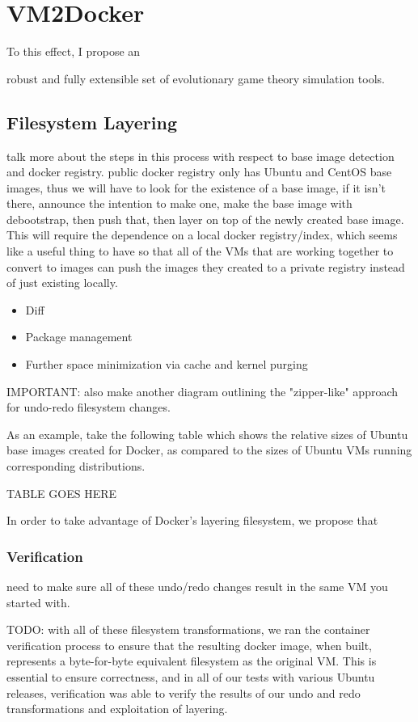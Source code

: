 \documentclass[\myfontsize, letterpaper]{article}
\newcommand{\projectname}{VM2Docker}
\begin{document}
\section{\projectname}
To this effect, I propose an

 robust and fully extensible set of evolutionary game theory simulation tools. 

\subsection{Filesystem Layering}

talk more about the steps in this process with respect to base image detection and docker registry. public docker registry only has Ubuntu and CentOS base images, thus we will have to look for the existence of a base image, if it isn't there, announce the intention to make one, make the base image with debootstrap, then push that, then layer on top of the newly created base image. This will require the dependence on a local docker registry/index, which seems like a useful thing to have so that all of the VMs that are working together to convert to images can push the images they created to a private registry instead of just existing locally.


\begin{itemize}
\item Diff
\item Package management
\item Further space minimization via cache and kernel purging
\end{itemize}


IMPORTANT: also make another diagram outlining the "zipper-like" approach for undo-redo filesystem changes.

As an example, take the following table which shows the relative sizes of Ubuntu base images created for Docker, as compared to the sizes of Ubuntu VMs running corresponding distributions.

TABLE GOES HERE

In order to take advantage of Docker's layering filesystem, we propose that

\subsubsection{Verification}
need to make sure all of these undo/redo changes result in the same VM you started with.

TODO: with all of these filesystem transformations, we ran the container verification process to ensure that the resulting docker image, when built, represents a byte-for-byte equivalent filesystem as the original VM. This is essential to ensure correctness, and in all of our tests with various Ubuntu releases, verification was able to verify the results of our undo and redo transformations and exploitation of layering.
\end{document}
